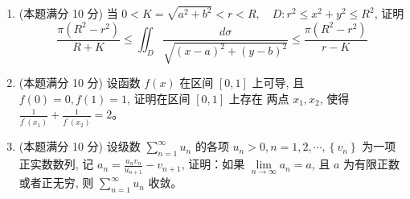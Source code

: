 \begin{enumerate}




\item 
(本题满分 10 分)
当 $0<K=\sqrt{a^{2}+b^{2}}<r<R, \quad D: r^{2} \leqslant x^{2}+y^{2} \leqslant R^{2}$, 证明
\[
\frac{\pi\left(R^{2}-r^{2}\right)}{R+K} \leqslant \iint_{D} \frac{d \sigma}{\sqrt{(x-a)^{2}+(y-b)^{2}}} \leqslant \frac{\pi\left(R^{2}-r^{2}\right)}{r-K}
\]





\item 
(本题满分 10 分)
设函数 $f(x)$ 在区间 $[0,1]$ 上可导, 且 $f(0)=0, f(1)=1$, 证明在区间 $[0,1]$ 上存在 两点 $x_{1}, x_{2}$, 使得 $\frac{1}{f^{\prime}\left(x_{1}\right)}+\frac{1}{f^{\prime}\left(x_{2}\right)}=2$。




\item 
(本题满分 10 分)
设级数 $\sum\limits_{n=1}^{\infty} u_{n}$ 的各项 $u_{n}>0, n=1,2, \cdots,\left\{v_{n}\right\}$ 为一项正实数数列, 记 $a_{n}=\frac{u_{n} v_{n}}{u_{n+1}}-v_{n+1}$, 证明：如果 $\lim\limits _{n \rightarrow \infty} a_{n}=a$, 且 $a$ 为有限正数或者正无穷, 则 $\sum\limits_{n=1}^{\infty} u_{n}$ 收敛。



	
	
	
\end{enumerate}


